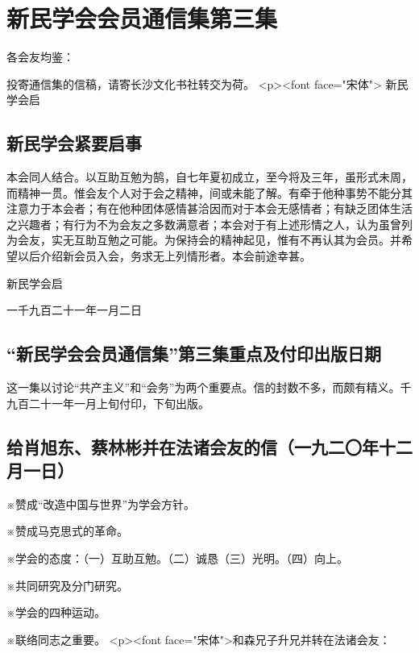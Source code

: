 \section{新民学会会员通信集第三集}



各会友均鉴：

投寄通信集的信稿，请寄长沙文化书社转交为荷。
<p><font face="宋体"> 
新民学会启
\subsection{新民学会紧要启事}

本会同人结合。以互助互勉为鹄，自七年夏初成立，至今将及三年，虽形式未周，而精神一贯。惟会友个人对于会之精神，间或未能了解。有牵于他种事势不能分其注意力于本会者；有在他种团体感情甚洽因而对于本会无感情者；有缺乏团体生活之兴趣者；有行为不为会友之多数满意者；本会对于有上述形情之人，认为虽曾列为会友，实无互助互勉之可能。为保持会的精神起见，惟有不再认其为会员。并希望以后介绍新会员入会，务求无上列情形者。本会前途幸甚。


新民学会启

一千九百二十一年一月二日
\subsection{“新民学会会员通信集”第三集重点及付印出版日期}

这一集以讨论“共产主义”和“会务”为两个重要点。信的封数不多，而颇有精义。千九百二十一年一月上旬付印，下旬出版。
\subsection{给肖旭东、蔡林彬并在法诸会友的信（一九二〇年十二月一日）}

※赞成“改造中国与世界”为学会方针。

※赞成马克思式的革命。

※学会的态度：（一）互助互勉。（二）诚恳（三）光明。（四）向上。

※共同研究及分门研究。

※学会的四种运动。

※联络同志之重要。
<p><font face="宋体">和森兄子升兄并转在法诸会友：

